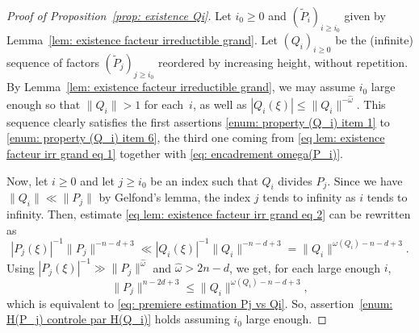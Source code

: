 \documentclass[JEP,XML,SOM,Unicode,NoFloatCountersInSection,published]{cedram}
\newcommand\tP{\widetilde{P}}
\newcommand\homega{\widehat{\omega}}\newcommand\HH{\mathcal{H}}
\newcommand{\normH}[1]{\|#1\|}
\theoremstyle{definition}
\theoremstyle{plain}
\begin{document}
\begin{proof}[Proof of Proposition~\ref{prop: existence Qi}]
Let $i_0\geq 0$ and $(\tP_i)_{i\geq i_0}$ given by Lemma~\ref{lem: existence facteur irreductible grand}. Let $(Q_i)_{i\geq 0}$ be the (infinite) sequence of factors $(\tP_j)_{j\geq i_0}$ reordered by increasing height, without repetition. By Lemma~\ref{lem: existence facteur irreductible grand}, we may assume $i_0$ large enough so that $\normH{Q_i} > 1$ for each~$i$, as well as $|Q_i(\xi)| \leq \normH{Q_i}^{-\homega}$. This sequence clearly satisfies the first assertions \eqref{enum: property (Q_i) item 1} to \eqref{enum: property (Q_i) item 6}, the third one coming from \eqref{eq lem: existence facteur irr grand eq 1} together with \eqref{eq: encadrement omega(P_i)}.

Now, let $i\geq 0$ and let $j\geq i_0$ be an index such that $Q_i$ divides $P_j$. Since we have $\normH{Q_i}\ll \normH{P_j}$ by Gelfond's lemma, the index $j$ tends to infinity as $i$ tends to infinity. Then, estimate \eqref{eq lem: existence facteur irr grand eq 2} can be rewritten as
\begin{equation}
\label{eq proof: inter 1 pour controler H(P_j)}
|P_j(\xi)|^{-1}\normH{P_j}^{-n-d+3} \ll |Q_i(\xi)|^{-1}\normH{Q_i}^{-n-d+3} = \normH{Q_i}^{\omega(Q_i)-n-d+3}.
\end{equation}
Using $|P_j(\xi)|^{-1} \gg \normH{P_j}^{\homega}$ and $\homega > 2n-d$, we get, for each large enough $i$,
\begin{equation*}
\normH{P_j}^{n-2d+3} \leq \normH{Q_i}^{\omega(Q_i)-n-d+3},
\end{equation*}
which is equivalent to \eqref{eq: premiere estimation Pj vs Qi}. So, assertion~\eqref{enum: H(P_j) controle par H(Q_i)} holds assuming $i_0$ large enough.


\end{proof}
\end{document}
